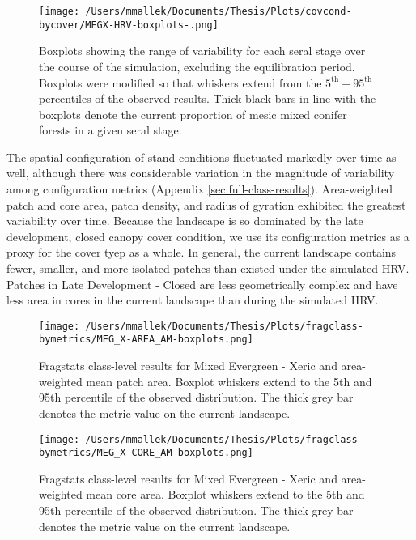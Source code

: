 \begin{figure}[!htbp]
  \centering
    \texttt{[image: /Users/mmallek/Documents/Thesis/Plots/covcond-bycover/MEGX-HRV-boxplots-.png]}
  \caption{Boxplots showing the range of variability for each seral stage over the course of the simulation, excluding the equilibration period. Boxplots were modified so that whiskers extend from the $5^{\text{th}} - 95^{\text{th}}$ percentiles of the observed results. Thick black bars in line with the boxplots denote the current proportion of mesic mixed conifer forests in a given seral stage.} 
  \label{fig:covcond_megx_boxplots}
\end{figure}

The spatial configuration of stand conditions fluctuated markedly over time as well, although there was considerable variation in the magnitude of variability among configuration metrics (Appendix \ref{sec:full-class-results}). Area-weighted patch and core area, patch density, and radius of gyration exhibited the greatest variability over time. Because the landscape is so dominated by the late development, closed canopy cover condition, we use its configuration metrics as a proxy for the cover tyep as a whole. In general, the current landscape contains fewer, smaller, and more isolated patches than existed under the simulated HRV. Patches in Late Development - Closed are less geometrically complex and have less area in cores in the current landscape than during the simulated HRV. 

\begin{figure}[!htbp]
\centering
    \texttt{[image: /Users/mmallek/Documents/Thesis/Plots/fragclass-bymetrics/MEG\_X-AREA\_AM-boxplots.png]}
  \caption{Fragstats class-level results for Mixed Evergreen - Xeric and area-weighted mean patch area. Boxplot whiskers extend to the 5th and 95th percentile of the observed distribution. The thick grey bar denotes the metric value on the current landscape.}
  \label{fig:megx_areaam}
\end{figure}


\begin{figure}[!htbp]
\centering
    \texttt{[image: /Users/mmallek/Documents/Thesis/Plots/fragclass-bymetrics/MEG\_X-CORE\_AM-boxplots.png]}
  \caption{Fragstats class-level results for Mixed Evergreen - Xeric and area-weighted mean core area. Boxplot whiskers extend to the 5th and 95th percentile of the observed distribution. The thick grey bar denotes the metric value on the current landscape.}
  \label{fig:megx_coream}
\end{figure}


